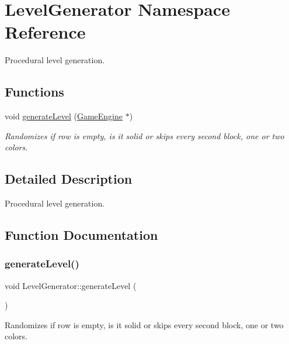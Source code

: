 \hypertarget{namespace_level_generator}{}\section{Level\+Generator Namespace Reference}
\label{namespace_level_generator}


Procedural level generation.  


\subsection*{Functions}
\begin{DoxyCompactItemize}
\item 
void \mbox{\hyperlink{namespace_level_generator_a58091b227ed84d1ed1aba4b2874fbcb6}{generate\+Level}} (\mbox{\hyperlink{class_game_engine}{Game\+Engine}} $\ast$)
\begin{DoxyCompactList}\small\item\em Randomizes if row is empty, is it solid or skips every second block, one or two colors. \end{DoxyCompactList}\end{DoxyCompactItemize}


\subsection{Detailed Description}
Procedural level generation. 

\subsection{Function Documentation}
\mbox{\label{namespace_level_generator_a58091b227ed84d1ed1aba4b2874fbcb6}} 
\subsubsection{\texorpdfstring{generateLevel()}{generateLevel()}}
{\footnotesize\ttfamily void Level\+Generator\+::generate\+Level (\begin{DoxyParamCaption}\item[{\mbox{\hyperlink{class_game_engine}{Game\+Engine}} $\ast$}]{ }\end{DoxyParamCaption})}



Randomizes if row is empty, is it solid or skips every second block, one or two colors. 

